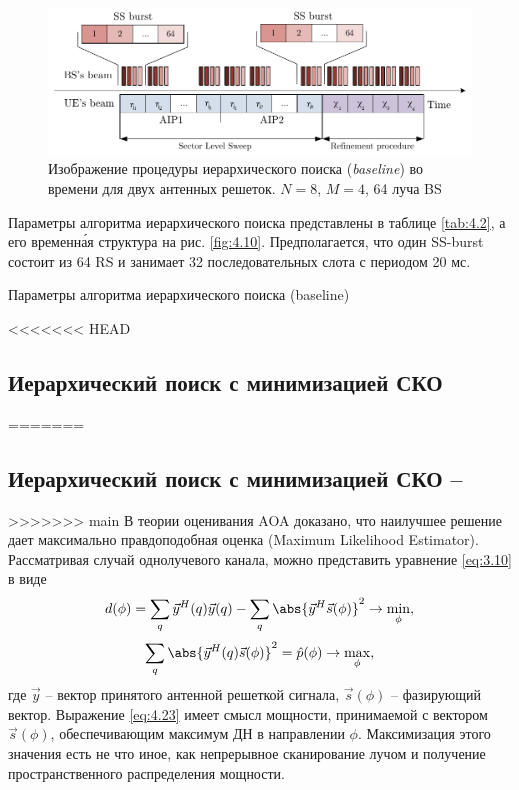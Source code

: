 \begin{figure}[ht]
    \centering
    \includegraphics[width=\linewidth]{figs/fig4.9}
    \caption{Изображение процедуры иерархического поиска (\textit{baseline}) во времени для двух антенных решеток. $N=8$, $M=4$, 64 луча BS}
    \label{fig:4.9}
\end{figure}

Параметры алгоритма иерархического поиска представлены в таблице \ref{tab:4.2}, а его временн\'{а}я
структура на рис. \ref{fig:4.10}.
Предполагается, что один SS-burst состоит из 64 RS и занимает 32 последовательных слота с периодом 20 мс.

\begin{table}
    \caption{Параметры алгоритма иерархического поиска (baseline)}
    \label{tab:4.2}
\end{table}


<<<<<<< HEAD
\subsection{Иерархический поиск с минимизацией СКО}
=======

\subsection[Иерархический поиск с минимизацией СКО]{Иерархический поиск с минимизацией СКО -- \hSearchMMSE{}}
\label{sec:hSearchMMSE:singlepath}
>>>>>>> main
В теории оценивания AOA доказано, что наилучшее решение дает максимально правдоподобная оценка (Maximum Likelihood Estimator).
Рассматривая случай однолучевого канала, можно представить уравнение \eqref{eq:3.10} в виде
\begin{equation}
    d(\phi) = \sum\limits_q \vec y^H(q) \vec y(q) - \sum\limits_q\abs{\vec y^H \vec s(\phi)}^2 \to \min_\phi,
\end{equation}
\begin{equation}
    \label{eq:4.23}
    \sum\limits_q \abs{\vec y^H(q) \vec s(\phi)}^2 = \hat p(\phi) \to \max_\phi,
\end{equation}
где $\vec y$ -- вектор принятого антенной решеткой сигнала, $\vec s(\phi)$ --
фазирующий вектор. Выражение \eqref{eq:4.23} имеет смысл мощности,
принимаемой с  вектором $\vec s(\phi)$, обеспечивающим максимум ДН в направлении
$\phi$. Максимизация этого значения есть не что иное, как непрерывное
сканирование лучом и получение пространственного распределения мощности.

